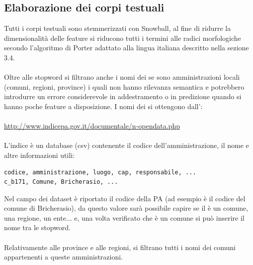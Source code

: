 \documentclass{article}
\theoremstyle{plain}
\theoremstyle{definition}
\begin{document}
\subsection{Elaborazione dei corpi testuali}
Tutti i corpi testuali sono stemmerizzati con Snowball, al fine di ridurre la dimensionalità delle feature si riducono tutti i termini alle radici morfologiche secondo l'algoritmo di Porter adattato alla lingua italiana descritto nella sezione 3.4.
\\
\\
Oltre alle stopword si filtrano anche i nomi dei  se sono amministrazioni locali (comuni, regioni, province) i quali non hanno rilevanza semantica e potrebbero introdurre un errore considerevole in addestramento o in predizione quando si hanno poche feature a disposizione. I nomi dei  si ottengono dall':
\\
\\
\url{http://www.indicepa.gov.it/documentale/n-opendata.php}
\\
\\
L'indice è un database (csv) contenente il codice dell'amministrazione, il nome e altre informazioni utili:
\begin{verbatim}
codice, amministrazione, luogo, cap, responsabile, ...
c_b171, Comune, Bricherasio, ...
\end{verbatim}
Nel campo  dei dataset è riportato il codice della PA (ad esempio  è il codice del comune di Bricherasio), da questo valore sarà possibile capire se il  è un comune, una regione, un ente... e, una volta verificato che è un comune si può inserire il nome tra le stopword.
\\
\\
Relativamente alle province e alle regioni, si filtrano tutti i nomi dei comuni appartenenti a queste amministrazioni. 

\newpage
\end{document}
